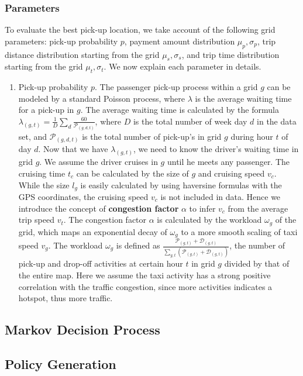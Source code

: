 \documentclass[letterpaper, 10 pt, conference]{ieeeconf}
\begin{document}
\subsubsection{Parameters}
To evaluate the best pick-up location, we take account of the following grid parameters: pick-up probability $p$, payment amount distribution $\mu_p, \sigma_p$, trip distance distribution starting from the grid $\mu_s, \sigma_s$, and trip time distribution starting from the grid $\mu_t, \sigma_t$. We now explain each parameter in details.
\begin{enumerate}
\item Pick-up probability $p$. The passenger pick-up process within a grid $g$ can be modeled by a standard Poisson process, where $\lambda$ is the average waiting time for a pick-up in $g$. The average waiting time is calculated by the formula $\lambda_{(g,t)} = \frac{1}{D}\sum_d\frac{60}{\mathcal{P}_{(g,d,t)}}$, where $D$ is the total number of week day $d$ in the data set, and $\mathcal{P}_{(g,d,t)}$ is the total number of pick-up's in grid $g$ during hour $t$ of day $d$. Now that we have $\lambda_{(g,t)}$, we need to know the driver's waiting time in grid $g$. We assume the driver cruises in $g$ until he meets any passenger. The cruising time $t_c$ can be calculated by the size of $g$ and cruising speed $v_c$. While the size $l_g$ is easily calculated by using haversine formulas with the GPS coordinates, the cruising speed $v_c$ is not included in data. Hence we introduce the concept of \textbf{congestion factor} $\alpha$ to infer $v_c$ from the average trip speed $v_t$. The congestion factor $\alpha$ is calculated by the workload $\omega_g$ of the grid, which maps an exponential decay of $\omega_g$ to a more smooth scaling of taxi speed $v_g$. The workload $\omega_g$ is defined as $\frac{\mathcal{P}_{(g,t)}+\mathcal{D}_{(g,t)}}{\sum_{g,t}(\mathcal{P}_{(g,t)}+\mathcal{D}_{(g,t)})}$, the number of pick-up and drop-off activities at certain hour $t$ in grid $g$ divided by that of the entire map. Here we assume the taxi activity has a strong positive correlation with the traffic congestion, since more activities indicates a hotspot, thus more traffic. 
\end{enumerate}
\subsection{Markov Decision Process}

\subsection{Policy Generation}
\end{document}
